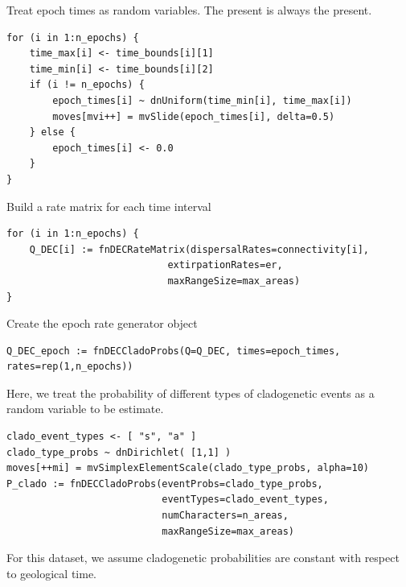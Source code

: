 
Treat epoch times as random variables. The present is always the present.
\begin{snugshade}
\begin{lstlisting}
for (i in 1:n_epochs) {
    time_max[i] <- time_bounds[i][1]
    time_min[i] <- time_bounds[i][2]
    if (i != n_epochs) {
        epoch_times[i] ~ dnUniform(time_min[i], time_max[i])
        moves[mvi++] = mvSlide(epoch_times[i], delta=0.5)
    } else {
        epoch_times[i] <- 0.0
    }
}
\end{lstlisting}
\end{snugshade}



Build a rate matrix for each time interval
\begin{snugshade}
\begin{lstlisting}
for (i in 1:n_epochs) {
    Q_DEC[i] := fnDECRateMatrix(dispersalRates=connectivity[i],
                            extirpationRates=er,
                            maxRangeSize=max_areas)
}
\end{lstlisting}
\end{snugshade}


Create the epoch rate generator object
\begin{snugshade}
\begin{lstlisting}
Q_DEC_epoch := fnDECCladoProbs(Q=Q_DEC, times=epoch_times, rates=rep(1,n_epochs))
\end{lstlisting}
\end{snugshade}


Here, we treat the probability of different types of cladogenetic events as a random variable to be estimate.

\begin{snugshade}
\begin{lstlisting}
clado_event_types <- [ "s", "a" ]
clado_type_probs ~ dnDirichlet( [1,1] )
moves[++mi] = mvSimplexElementScale(clado_type_probs, alpha=10)
P_clado := fnDECCladoProbs(eventProbs=clado_type_probs,
                           eventTypes=clado_event_types,
                           numCharacters=n_areas,
                           maxRangeSize=max_areas)
\end{lstlisting}
\end{snugshade}

For this dataset, we assume cladogenetic probabilities are constant with respect to geological time.


